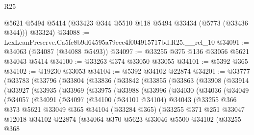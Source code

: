 \begin{lexlean}{R25}
\begin{coremodule}
      @5621
      @5494
      @5414
      (@33423 @344 @5510 @118 @5494 @33434 (@5773 (@33436 @344)))
      @33324)
@34088 := LexLeanPreserve.Ca5fe8b9d64595a79eee4f004915717bd.R25.__rel_10
@34091 := @34063 (@34087 (@34088 @5493))
@34097 := @33255 @375 @136 @33056 @5621 @34043 @5414
@34100 := @33263 @374 @33050 @33055
@34101 := @5392 @365
@34102 := @19230 @33053
@34104 := @5392 @34102 @22874
@34201 := @33777
    (@33783
      (@33796
        (@33804
          (@33836
            (@33842
              (@33855
                (@33863
                  (@33908
                    (@33914
                      (@33927
                        (@33935
                          (@33969
                            (@33975
                              (@33988
                                (@33996
                                  (@34030
                                    (@34036
                                      (@34049
                                        (@34057
                                          (@34091
                                            (@34097
                                              (@34100
                                                (@34101 @34104)
                                                @34043
                                                (@33255
                                                  @366
                                                  @373
                                                  @5621
                                                  @33049
                                                  @365
                                                  @34104
                                                  (@33284 @365)
                                                  (@33255
                                                    @371
                                                    @251
                                                    @33047
                                                    @12018
                                                    @34102
                                                    @22874
                                                    (@34064
                                                      @370
                                                      @5623
                                                      @33046
                                                      @5500
                                                      @34102
                                                      (@33255
                                                        @368

\end{coremodule}
\end{lexlean}

